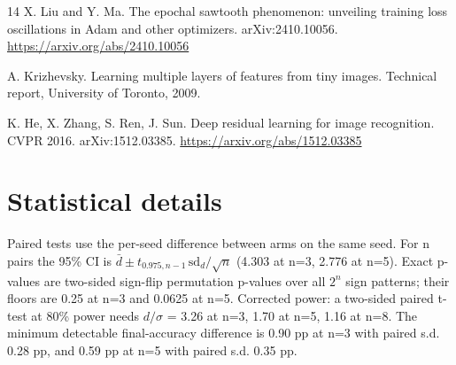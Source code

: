 \documentclass[11pt,a4paper]{article}
\begin{document}
\begin{thebibliography}{14}
 X. Liu and Y. Ma. The epochal sawtooth phenomenon: unveiling training loss oscillations in Adam and other optimizers. arXiv:2410.10056. \url{https://arxiv.org/abs/2410.10056}

 A. Krizhevsky. Learning multiple layers of features from tiny images. Technical report, University of Toronto, 2009.

 K. He, X. Zhang, S. Ren, J. Sun. Deep residual learning for image recognition. CVPR 2016. arXiv:1512.03385. \url{https://arxiv.org/abs/1512.03385}

\end{thebibliography}

\appendix
\section{Statistical details}
Paired tests use the per-seed difference between arms on the same seed. For n pairs the 95\% CI is $\bar{d} \pm t_{0.975,n-1}\,\mathrm{sd}_d/\sqrt{n}$ (4.303 at n=3, 2.776 at n=5). Exact p-values are two-sided sign-flip permutation p-values over all $2^n$ sign patterns; their floors are 0.25 at n=3 and 0.0625 at n=5. Corrected power: a two-sided paired t-test at 80\% power needs $d/\sigma$ = 3.26 at n=3, 1.70 at n=5, 1.16 at n=8. The minimum detectable final-accuracy difference is 0.90 pp at n=3 with paired s.d. 0.28 pp, and 0.59 pp at n=5 with paired s.d. 0.35 pp.
\end{document}
